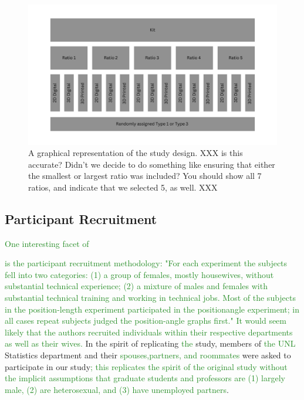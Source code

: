 \documentclass[letterpaper,inpress,dvipsnames]{jdsart}
\begin{document}
\begin{figure}
\includegraphics[width=6.4in]{study-design} \caption{A graphical representation of the study design. XXX is this accurate? Didn't we decide to do something like ensuring that either the smallest or largest ratio was included? You should show all 7 ratios, and indicate that we selected 5, as well. XXX}\label{fig:studyDesign}
\end{figure}

\hypertarget{participant-recruitment}{%
\subsection{Participant Recruitment}\label{participant-recruitment}}

{\textcolor{ForestGreen}{One interesting facet of}}

\citet{cleveland_graphical_1984}
{\textcolor{ForestGreen}{is the participant recruitment methodology: "For each experiment the subjects fell into two categories: (1) a group of females, mostly housewives, without substantial technical experience; (2) a mixture of males and females with substantial technical training and working in technical jobs. Most of the subjects in the position-length experiment participated in the positionangle experiment; in all cases repeat subjects judged the position-angle graphs first." It would seem likely that the authors recruited individuals within their respective departments as well as their wives.}}
In the spirit of replicating {\textcolor{ForestGreen}{the}} study, members of {\textcolor{ForestGreen}{the UNL}} Statistics department and their {\textcolor{ForestGreen}{spouses,partners, and roommates}} were asked to participate in our study{\textcolor{ForestGreen}{; this replicates the spirit of the original study without the implicit assumptions that graduate students and professors are (1) largely male, (2) are heterosexual, and (3) have unemployed partners}}.
\end{document}
